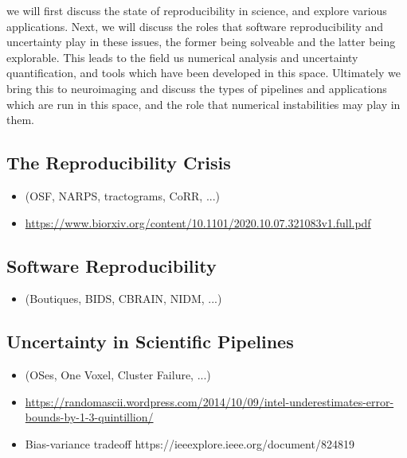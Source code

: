 we will first discuss the state of reproducibility in science, and explore various applications. Next, we will discuss
the roles that software reproducibility and uncertainty play in these issues, the former being solveable and the latter
being explorable. This leads to the field us numerical analysis and uncertainty quantification, and tools which have
been developed in this space. Ultimately we bring this to neuroimaging and discuss the types of pipelines and
applications which are run in this space, and the role that numerical instabilities may play in them.

\subsection{The Reproducibility Crisis}
\begin{itemize}
\item (OSF, NARPS, tractograms, CoRR, ...)
\item \url{https://www.biorxiv.org/content/10.1101/2020.10.07.321083v1.full.pdf}
\end{itemize}

\subsection{Software Reproducibility}
\begin{itemize}
\item (Boutiques, BIDS, CBRAIN, NIDM, ...)
\end{itemize}

\subsection{Uncertainty in Scientific Pipelines}
\begin{itemize}
\item (OSes, One Voxel, Cluster Failure, ...)
\item \url{https://randomascii.wordpress.com/2014/10/09/intel-underestimates-error-bounds-by-1-3-quintillion/}
\item Bias-variance tradeoff https://ieeexplore.ieee.org/document/824819
\end{itemize}

